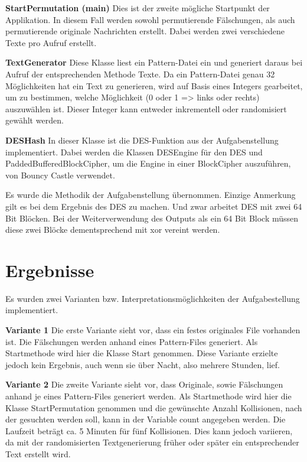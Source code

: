\documentclass[12pt]{scrartcl}
\begin{document}
\textbf{StartPermutation (main)}\newline
Dies ist der zweite  mögliche Startpunkt der Applikation. In diesem Fall werden sowohl permutierende Fälschungen, als auch permutierende originale Nachrichten erstellt. Dabei werden zwei verschiedene Texte pro Aufruf erstellt.

\textbf{TextGenerator}\newline
Diese Klasse liest ein Pattern-Datei ein und generiert daraus bei Aufruf der entsprechenden Methode Texte. Da ein Pattern-Datei genau 32 Möglichkeiten hat ein Text zu generieren, wird auf Basis eines Integers gearbeitet, um zu bestimmen, welche Möglichkeit (0 oder 1 => links oder rechts) auszuwählen ist. Dieser Integer kann entweder inkrementell oder randomisiert gewählt werden.

\textbf{DESHash}\newline
In dieser Klasse ist die DES-Funktion aus der Aufgabenstellung implementiert. Dabei werden die Klassen DESEngine für den DES und PaddedBufferedBlockCipher, um die Engine in einer BlockCipher auszuführen, von Bouncy Castle verwendet.

Es wurde die Methodik der Aufgabenstellung übernommen. Einzige Anmerkung gilt es bei dem Ergebnis des DES zu machen. Und zwar arbeitet DES mit zwei 64 Bit Blöcken. Bei der Weiterverwendung des Outputs als ein 64 Bit Block müssen diese zwei Blöcke dementsprechend mit xor vereint werden.

\section{Ergebnisse}
Es wurden zwei Varianten bzw. Interpretationsmöglichkeiten der Aufgabestellung implementiert.

\textbf{Variante 1}\newline
Die erste Variante sieht vor, dass ein festes originales File vorhanden ist. Die Fälschungen werden anhand eines Pattern-Files generiert.\newline
Als Startmethode wird hier die Klasse Start genommen.
Diese Variante erzielte jedoch kein Ergebnis, auch wenn sie über Nacht, also mehrere Stunden, lief.

\textbf{Variante 2}\newline
Die zweite Variante sieht vor, dass Originale, sowie Fälschungen anhand je eines Pattern-Files generiert werden.\newline
Als Startmethode wird hier die Klasse StartPermutation genommen und die gewünschte Anzahl Kollisionen, nach der gesuchten werden soll, kann in der Variable count angegeben werden.\newline
Die Laufzeit beträgt ca. 5 Minuten für fünf Kollisionen. Dies kann jedoch variieren, da mit der randomisierten Textgenerierung früher oder später ein entsprechender Text erstellt wird.
\end{document}
